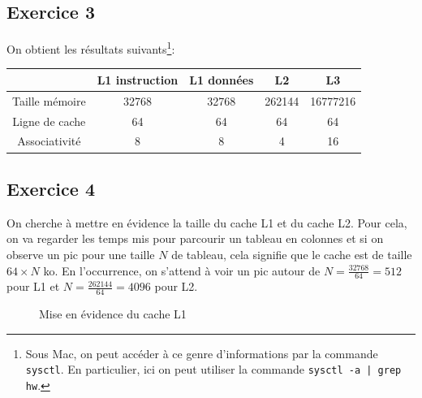 \documentclass[11pt, a4 paper]{article}
\begin{document}
\subsection{Exercice 3}

On obtient les résultats suivants\footnote{Sous Mac, on peut accéder à ce genre d'informations par la commande \texttt{sysctl}. En particulier, ici on peut utiliser la commande \texttt{sysctl -a | grep hw}.}:
\begin{center}
    \begin{tabular}{| c || c | c | c | c |}
        \hline
    & L1 instruction & L1 données & L2 & L3 \\
        \hline
    Taille mémoire & 32768 & 32768 & 262144 & 16777216 \\
        \hline
    Ligne de cache & 64 & 64 & 64 & 64 \\
        \hline
    Associativité & 8 & 8 & 4 & 16 \\
        \hline
    \end{tabular}
\end{center}

\subsection{Exercice 4}
On cherche à mettre en évidence la taille du cache L1 et du cache L2. Pour cela, on va regarder les temps mis pour parcourir un tableau en colonnes et si on observe un pic pour une taille $N$ de tableau, cela signifie que le cache est de taille $64\times N$ ko. En l'occurrence, on s'attend à voir un pic autour de $N = \frac{32768}{64} = 512$ pour L1 et $N = \frac{262144}{64} = 4096$ pour L2.

\begin{figure}[!h]
    \caption{Mise en évidence du cache L1}
\end{figure}
\end{document}
